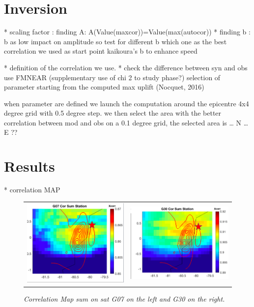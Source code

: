 \documentclass{gji}
\begin{document}
\section{Inversion}

*  scaling factor : finding A:  
                A(Value(maxcor))=Value(max(autocor))
*  finding b : b as low impact on amplitude so test for different b which one as the best correlation 
                    we used as start point kaikoura’s b to enhance speed


* definition of the correlation we use.
*  check the difference between syn and obs use FMNEAR
                (supplementary use of chi 2 to study phase?) 
    selection of parameter
        starting from the computed max uplift (Nocquet, 2016)
       
      
        when parameter are defined we launch the computation around the epicentre 4x4 degree grid with 0.5 degree step. we then select the area with the better correlation between mod and obs on a 0.1 degree grid, the selected area is … N …E ??
        
        
        \section{Results}
        
        
        
        * correlation MAP


\begin{figure}
 \begin{tabular}{l r}
\includegraphics[width=0.44\linewidth]{images/cor_Map_G30_old.png} & 
\includegraphics[width=0.50\linewidth]{images/cor_Map_G07_old.png}
 
\end{tabular}
\caption{ \textit{\emph{Correlation Map sum on sat G07 on the left and G30 on the right}.    }}
\label{Corr_Map}
\end{figure}
\end{document}
